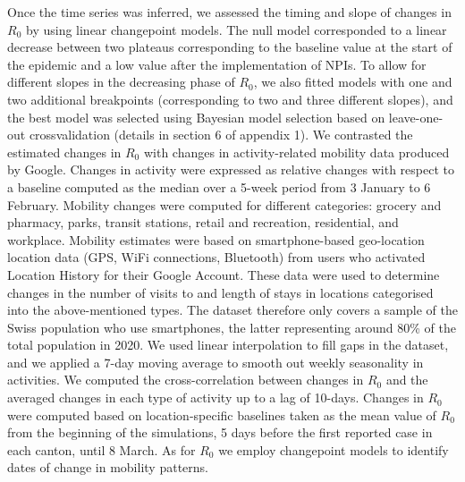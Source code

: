 Once the time series was inferred, we assessed the timing and slope of changes in $R_0$ by using linear changepoint models\cite{Lindelov:McpPackageRegression:2020}. The null model corresponded to a linear decrease between two plateaus corresponding to the baseline value at the start of the epidemic and a low value after the implementation of NPIs. To allow for different slopes in the decreasing phase of $R_0$, we also fitted models with one and two additional breakpoints (corresponding to two and three different slopes), and the best model was selected using Bayesian model selection based on leave-one-out crossvalidation (details in section 6 of appendix 1). We contrasted the estimated changes in $R_0$ with changes in activity-related mobility data produced by Google\cite{GoogleLLC:GoogleCOVID19Community:2020}. Changes in activity were expressed as relative changes with respect to a baseline computed as the median over a 5-week period from 3 January to 6 February. Mobility changes were computed for different categories: grocery and pharmacy, parks, transit stations, retail and recreation, residential, and workplace. Mobility estimates were based on smartphone-based geo-location location data (GPS, WiFi connections, Bluetooth) from users who activated Location History for their Google Account. These data were used to determine changes in the number of visits to and length of stays in locations categorised into the above-mentioned types. The dataset therefore only covers a sample of the Swiss population who use smartphones, the latter representing around 80\% of the total population in 2020\cite{ODea:SmartphoneUsersSwitzerland:2020}. We used linear interpolation to fill gaps in the dataset, and we applied a 7-day moving average to smooth out weekly seasonality in activities. We computed the cross-correlation between changes in $R_0$ and the averaged changes in each type of activity up to a lag of 10-days. Changes in $R_0$ were computed based on location-specific baselines taken as the mean value of $R_0$ from the beginning of the simulations, 5 days before the first reported case in each canton, until 8 March. As for $R_0$ we employ changepoint models to identify dates of change in mobility patterns. 


